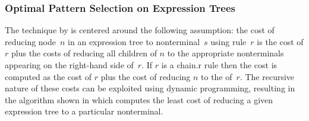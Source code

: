 \subsubsection{Optimal Pattern Selection on Expression Trees}

The technique by \citeauthor{AhoEtAl:1989} is centered around the following
assumption: the cost of reducing \gls{node}~$n$ in an \gls{expression tree} to
\gls{nonterminal}~$s$ using \gls{rule}~$r$ is the cost of $r$ plus the costs of
reducing all children of $n$ to the appropriate \glspl{nonterminal} appearing on
the right-hand side of~$r$.
%
If $r$ is a \gls{chain.r} \gls{rule} then the cost is computed as the cost of
$r$ plus the cost of reducing $n$ to the  of~$r$.
%
The recursive nature of these costs can be exploited using dynamic programming,
resulting in the algorithm shown in  which
computes the least cost of reducing a given \gls{expression tree} to a
particular \gls{nonterminal}.

